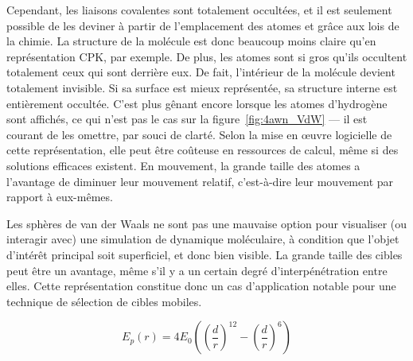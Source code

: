 	Cependant, les liaisons covalentes sont totalement occultées, et il est seulement possible de les \og deviner \fg{} à partir de l'emplacement des atomes et grâce aux lois de la chimie. La structure de la molécule est donc beaucoup moins claire qu'en représentation CPK, par exemple. De plus, les atomes sont si gros qu'ils occultent totalement ceux qui sont derrière eux. De fait, l'intérieur de la molécule devient totalement invisible. Si sa surface est mieux représentée, sa structure interne est entièrement occultée. C'est plus gênant encore lorsque les atomes d'hydrogène sont affichés, ce qui n'est pas le cas sur la figure~\ref{fig:4awn_VdW} --- il est courant de les omettre, par souci de clarté. Selon la mise en \oe{}uvre logicielle de cette représentation, elle peut être coûteuse en ressources de calcul, même si des solutions efficaces existent. En mouvement, la grande taille des atomes a l'avantage de diminuer leur mouvement relatif, c'est-à-dire leur mouvement par rapport à eux-mêmes.
		
	Les sphères de van der Waals ne sont pas une mauvaise option pour visualiser (ou interagir avec) une simulation de dynamique moléculaire, à condition que l'objet d'intérêt principal soit superficiel, et donc bien visible. La grande taille des cibles peut être un avantage, même s'il y a un certain degré d'interpénétration entre elles. Cette représentation constitue donc un cas d'application notable pour une technique de sélection de cibles mobiles.
		
	\begin{equation}
		\label{eq:lennard}
		E_{p}\left(r\right) = 4E_{0} \left( \left(\frac{d}{r}\right)^{12} - \left(\frac{d}{r}\right)^{6} \right)
	\end{equation}
		
